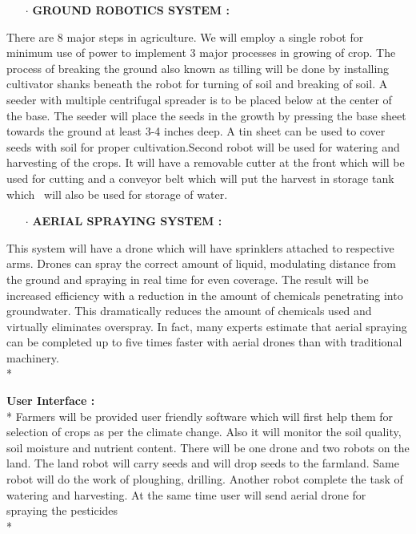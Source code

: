 \documentclass[12pt]{article}
\begin{document}
\begin{itemize}
	\item[$\cdot$] \textbf{GROUND ROBOTICS SYSTEM :}
\end{itemize}
 There are 8 major steps in agriculture. We will employ a single robot for minimum use of power to implement 3 major processes in growing of crop. The process of breaking the ground also known as tilling will be done by installing cultivator shanks beneath the robot for turning of soil and breaking of soil. A seeder with multiple centrifugal spreader is to be placed below at the center of the base. The seeder will place the seeds in the growth by pressing the base sheet towards the ground at least 3-4 inches deep. A tin sheet can be used to cover seeds with soil for proper cultivation.Second robot will be used for watering and harvesting of the crops. It will have a removable cutter at the front which will be used for cutting and a conveyor belt which will put the harvest in storage tank which  will also be used for storage of water.  

\begin{itemize}
	\item[$\cdot$] \textbf{ AERIAL SPRAYING SYSTEM :}
\end{itemize}
This system will have a drone which will have sprinklers attached to respective arms. Drones can spray the correct amount of liquid, modulating distance from the ground and spraying in real time for even coverage. The result will be increased efficiency with a reduction in the amount of chemicals penetrating into groundwater. This dramatically reduces the amount of chemicals used and virtually eliminates overspray. In fact, many experts estimate that aerial spraying can be completed up to five times faster with aerial drones than with traditional machinery. \\*



\textbf{User Interface :}
\\* Farmers will be provided user friendly software which will first help them for selection of crops as per the climate change. Also it will monitor the soil quality, soil moisture and nutrient content. 
There will be one drone and two robots on the land. The land robot will carry seeds and will drop seeds to the farmland. Same robot will do the work of ploughing, drilling. Another robot complete the task of watering and harvesting. At the same time user will send aerial drone for spraying the pesticides \\*
\end{document}
